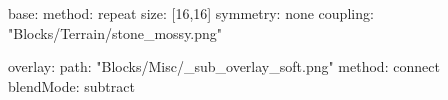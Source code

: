 base:
  method: repeat
  size: [16,16]
  symmetry: none
  coupling: "Blocks/Terrain/stone_mossy.png"

overlay:
  path: "Blocks/Misc/_sub_overlay_soft.png"
  method: connect
blendMode: subtract
